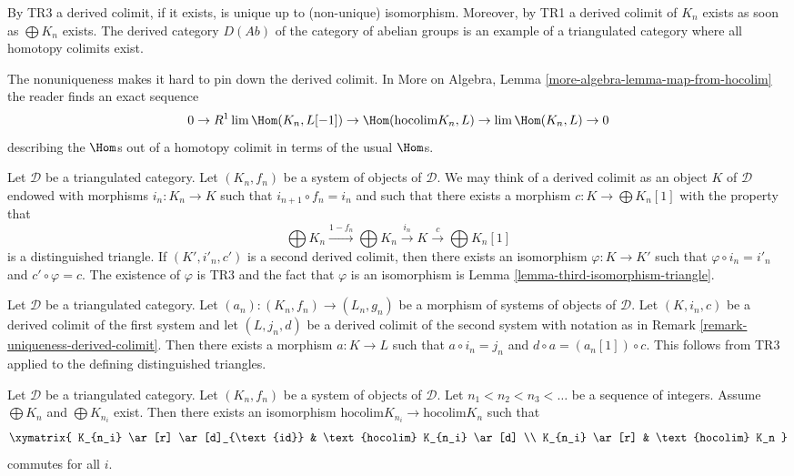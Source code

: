 \noindent
By TR3 a derived colimit, if it exists, is unique up to (non-unique)
isomorphism. Moreover, by TR1 a derived colimit of $K_n$ exists
as soon as $\bigoplus K_n$ exists. The derived category $D(\textit{Ab})$
of the category of abelian groups is an example of a triangulated
category where all homotopy colimits exist.

\medskip\noindent
The nonuniqueness makes it hard to pin down the derived colimit. In
More on Algebra, Lemma \ref{more-algebra-lemma-map-from-hocolim}
the reader finds an exact sequence
$$
0 \to R^1\lim \Hom(K_n, L[-1]) \to \Hom(\text{hocolim} K_n, L)
\to \lim \Hom(K_n, L) \to 0
$$
describing the $\Hom$s out of a homotopy colimit in terms of the
usual $\Hom$s.

\begin{remark}
\label{remark-uniqueness-derived-colimit}
Let $\mathcal{D}$ be a triangulated category.
Let $(K_n, f_n)$ be a system of objects of $\mathcal{D}$.
We may think of a derived colimit as an object $K$
of $\mathcal{D}$ endowed with morphisms $i_n : K_n \to K$
such that $i_{n + 1} \circ f_n = i_n$ and such that there
exists a morphism $c : K \to \bigoplus K_n[1]$ with the property that
$$
\bigoplus K_n \xrightarrow{1 - f_n} \bigoplus K_n \xrightarrow{i_n}
K \xrightarrow{c} \bigoplus K_n[1]
$$
is a distinguished triangle. If $(K', i'_n, c')$ is a second
derived colimit, then there exists an isomorphism
$\varphi : K \to K'$ such that $\varphi \circ i_n = i'_n$ and
$c' \circ \varphi = c$. The existence of $\varphi$ is
TR3 and the fact that $\varphi$ is an isomorphism is
Lemma \ref{lemma-third-isomorphism-triangle}.
\end{remark}

\begin{remark}
\label{remark-functoriality-derived-colimit}
Let $\mathcal{D}$ be a triangulated category.
Let $(a_n) : (K_n, f_n) \to (L_n, g_n)$ be a morphism of systems
of objects of $\mathcal{D}$. Let $(K, i_n, c)$ be a derived
colimit of the first system and let $(L, j_n, d)$ be a derived
colimit of the second system with notation as in
Remark \ref{remark-uniqueness-derived-colimit}.
Then there exists a morphism $a : K \to L$
such that $a \circ i_n = j_n$ and $d \circ a = (a_n[1]) \circ c$.
This follows from TR3 applied to the defining distinguished
triangles.
\end{remark}

\begin{lemma}
\label{lemma-hocolim-subsequence}
Let $\mathcal{D}$ be a triangulated category.
Let $(K_n, f_n)$ be a system of objects of $\mathcal{D}$.
Let $n_1 < n_2 < n_3 < \ldots$ be a sequence of integers.
Assume $\bigoplus K_n$ and $\bigoplus K_{n_i}$ exist.
Then there exists an isomorphism
$\text{hocolim} K_{n_i} \to \text{hocolim} K_n$
such that
$$
\xymatrix{
K_{n_i} \ar[r] \ar[d]_{\text{id}} & \text{hocolim} K_{n_i} \ar[d] \\
K_{n_i} \ar[r] & \text{hocolim} K_n
}
$$
commutes for all $i$.
\end{lemma}

